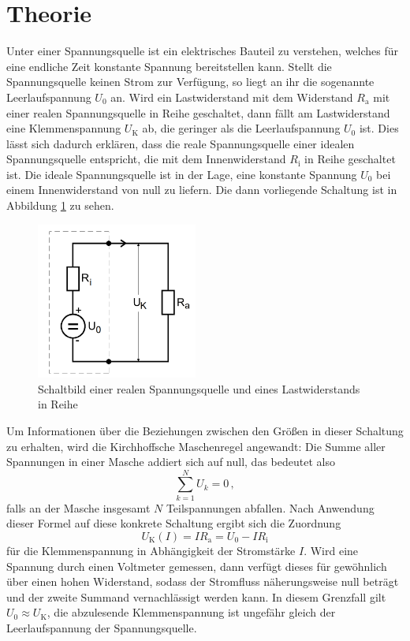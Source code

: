 \section{Theorie}
\label{sec:Theorie}
Unter einer Spannungsquelle ist ein elektrisches Bauteil zu verstehen,
welches für eine endliche Zeit konstante Spannung bereitstellen kann. Stellt die
Spannungsquelle keinen Strom zur Verfügung, so liegt an ihr die sogenannte Leerlaufspannung
$U_0$ an. Wird ein Lastwiderstand mit dem Widerstand $R_\text{a}$ mit
einer realen Spannungsquelle in Reihe geschaltet, dann fällt am Lastwiderstand
eine Klemmenspannung $U_\text{K}$ ab, die geringer als die Leerlaufspannung $U_0$
ist. Dies lässt sich dadurch erklären, dass die reale Spannungsquelle einer
idealen Spannungsquelle entspricht, die mit dem Innenwiderstand
$R_\text{i}$ in Reihe geschaltet ist. Die ideale Spannungsquelle ist in der Lage,
eine konstante Spannung $U_0$ bei einem Innenwiderstand von null zu liefern.
Die dann vorliegende Schaltung ist in Abbildung \ref{fig:ersatzschaltbild} zu sehen.

\begin{figure}
  \centering
  \includegraphics[width=150pt]{data/ersatzschaltbild.png}
  \caption{Schaltbild einer realen Spannungsquelle und eines Lastwiderstands in Reihe \cite{Versuchsanleitung}}
  \label{fig:ersatzschaltbild}
\end{figure}

Um Informationen über die Beziehungen zwischen den Größen in dieser Schaltung zu erhalten,
wird die Kirchhoffsche Maschenregel angewandt: Die Summe aller Spannungen in einer
Masche addiert sich auf null, das bedeutet also
\begin{equation}
  \sum\limits_{k=1}^N U_k = 0\,,
  \label{eqn:kirchhoffmasche}
\end{equation}
falls an der Masche insgesamt $N$ Teilspannungen abfallen.
Nach Anwendung dieser Formel auf diese konkrete Schaltung ergibt sich die Zuordnung
\begin{equation}
  U_\text{K}(I) = I R_\text{a} = U_0 - I R_\text{i}
  \label{eqn:klemmevoni}
\end{equation}
für die Klemmenspannung in Abhängigkeit der Stromstärke $I$. Wird eine Spannung durch
einen Voltmeter gemessen, dann verfügt dieses für gewöhnlich über einen hohen Widerstand,
sodass der Stromfluss näherungsweise null beträgt und der zweite Summand vernachlässigt
werden kann.
In diesem Grenzfall gilt $U_0 \approx U_\text{K}$, die abzulesende
Klemmenspannung ist ungefähr gleich der Leerlaufspannung der Spannungsquelle.

